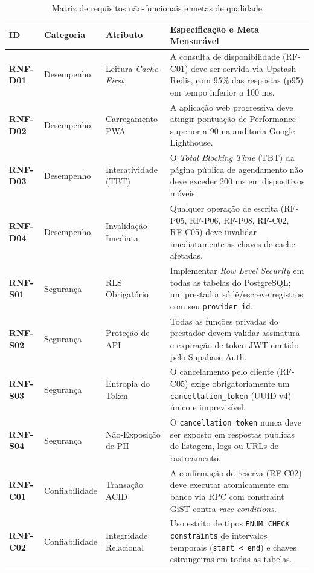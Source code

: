 \documentclass[12pt,a4paper]{article}
\begin{document}
\begin{table}[hbt]
\centering
\caption{Matriz de requisitos não-funcionais e metas de qualidade}
\label{quadro:requisitos_nao_funcionais}
\footnotesize
\renewcommand{\arraystretch}{1.2}
\begin{tabularx}{\textwidth}{|l|l|p{3.3cm}|X|}
\hline
\textbf{ID} & \textbf{Categoria} & \textbf{Atributo} & \textbf{Especificação e Meta Mensurável} \\ \hline
\textbf{RNF-D01} & Desempenho & Leitura \textit{Cache-First} & A consulta de disponibilidade (RF-C01) deve ser servida via Upstash Redis, com 95\% das respostas (p95) em tempo inferior a 100 ms. \\ \hline
\textbf{RNF-D02} & Desempenho & Carregamento PWA & A aplicação web progressiva deve atingir pontuação de Performance superior a 90 na auditoria Google Lighthouse. \\ \hline
\textbf{RNF-D03} & Desempenho & Interatividade (TBT) & O \textit{Total Blocking Time} (TBT) da página pública de agendamento não deve exceder 200 ms em dispositivos móveis. \\ \hline
\textbf{RNF-D04} & Desempenho & Invalidação Imediata & Qualquer operação de escrita (RF-P05, RF-P06, RF-P08, RF-C02, RF-C05) deve invalidar imediatamente as chaves de cache afetadas. \\ \hline
\textbf{RNF-S01} & Segurança & RLS Obrigatório & Implementar \textit{Row Level Security} em todas as tabelas do PostgreSQL; um prestador só lê/escreve registros com seu \texttt{provider\_id}. \\ \hline
\textbf{RNF-S02} & Segurança & Proteção de API & Todas as funções privadas do prestador devem validar assinatura e expiração de token JWT emitido pelo Supabase Auth. \\ \hline
\textbf{RNF-S03} & Segurança & Entropia do Token & O cancelamento pelo cliente (RF-C05) exige obrigatoriamente um \texttt{cancellation\_token} (UUID v4) único e imprevisível. \\ \hline
\textbf{RNF-S04} & Segurança & Não-Exposição de PII & O \texttt{cancellation\_token} nunca deve ser exposto em respostas públicas de listagem, logs ou URLs de rastreamento. \\ \hline
\textbf{RNF-C01} & Confiabilidade & Transação ACID & A confirmação de reserva (RF-C02) deve executar atomicamente em banco via RPC com constraint GiST contra \textit{race conditions}. \\ \hline
\textbf{RNF-C02} & Confiabilidade & Integridade Relacional & Uso estrito de tipos \texttt{ENUM}, \texttt{CHECK constraints} de intervalos temporais (\texttt{start < end}) e chaves estrangeiras em todas as tabelas. \\ \hline

\end{tabularx}
\end{table}
\end{document}
